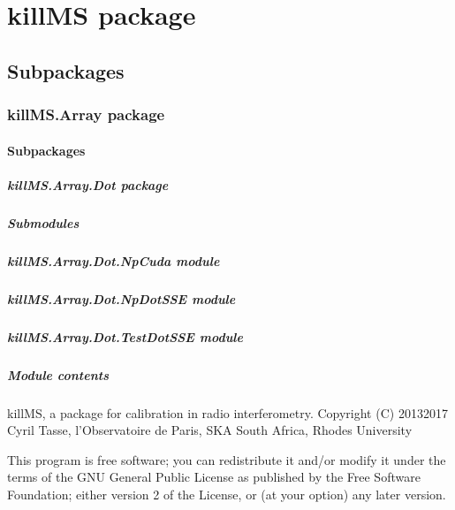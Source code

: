 \documentclass[letterpaper,10pt,english]{sphinxmanual}
\begin{document}
\section{killMS package}
\label{\detokenize{api/killMS:killms-package}}\label{\detokenize{api/killMS::doc}}

\subsection{Subpackages}
\label{\detokenize{api/killMS:subpackages}}
\sphinxstepscope


\subsubsection{killMS.Array package}
\label{\detokenize{api/killMS.Array:killms-array-package}}\label{\detokenize{api/killMS.Array::doc}}

\paragraph{Subpackages}
\label{\detokenize{api/killMS.Array:subpackages}}
\sphinxstepscope


\subparagraph{killMS.Array.Dot package}
\label{\detokenize{api/killMS.Array.Dot:killms-array-dot-package}}\label{\detokenize{api/killMS.Array.Dot::doc}}

\subparagraph{Submodules}
\label{\detokenize{api/killMS.Array.Dot:submodules}}

\subparagraph{killMS.Array.Dot.NpCuda module}
\label{\detokenize{api/killMS.Array.Dot:killms-array-dot-npcuda-module}}

\subparagraph{killMS.Array.Dot.NpDotSSE module}
\label{\detokenize{api/killMS.Array.Dot:killms-array-dot-npdotsse-module}}

\subparagraph{killMS.Array.Dot.TestDotSSE module}
\label{\detokenize{api/killMS.Array.Dot:killms-array-dot-testdotsse-module}}

\subparagraph{Module contents}
\label{\detokenize{api/killMS.Array.Dot:module-killMS.Array.Dot}}\label{\detokenize{api/killMS.Array.Dot:module-contents}}
\sphinxAtStartPar
killMS, a package for calibration in radio interferometry.
Copyright (C) 2013\sphinxhyphen{}2017  Cyril Tasse, l’Observatoire de Paris,
SKA South Africa, Rhodes University

\sphinxAtStartPar
This program is free software; you can redistribute it and/or
modify it under the terms of the GNU General Public License
as published by the Free Software Foundation; either version 2
of the License, or (at your option) any later version.
\end{document}
